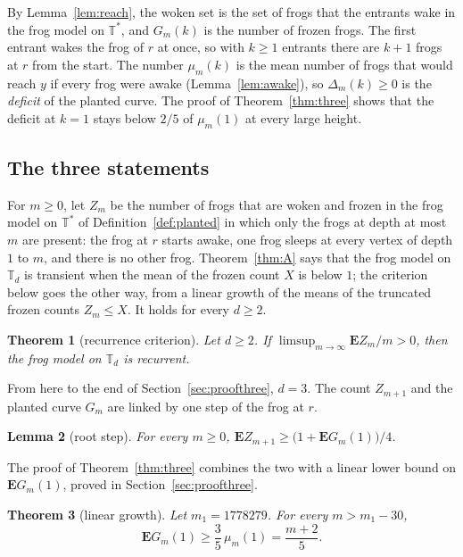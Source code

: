 \documentclass[11pt]{amsart}
\newtheorem{theorem}{Theorem}[section]
\newtheorem{lemma}[theorem]{Lemma}
\theoremstyle{definition}
\numberwithin{equation}{section}
\newcommand{\lean}[1]{\ignorespaces}
\newcommand{\T}{\mathbb{T}}
\newcommand{\Ts}{\mathbb{T}^{*}}
\newcommand{\E}{\mathbf{E}}
\begin{document}
By Lemma~\ref{lem:reach}, the woken set is the set of frogs that the entrants wake in the frog model on $\Ts$, and $G_m(k)$ is the number of frozen frogs. The first entrant wakes the frog of $r$ at once, so with $k\ge1$ entrants there are $k+1$ frogs at $r$ from the start. The number $\mu_m(k)$ is the mean number of frogs that would reach $y$ if every frog were awake (Lemma~\ref{lem:awake}), so $\Delta_m(k)\ge0$ is the \emph{deficit} of the planted curve. The proof of Theorem~\ref{thm:three} shows that the deficit at $k=1$ stays below $2/5$ of $\mu_m(1)$ at every large height.

\subsection*{The three statements}
For $m\ge0$, let $Z_m$ be the number of frogs that are woken and frozen in the frog model on $\Ts$ of Definition~\ref{def:planted} in which only the frogs at depth at most $m$ are present: the frog at $r$ starts awake, one frog sleeps at every vertex of depth $1$ to $m$, and there is no other frog. Theorem~\ref{thm:A} says that the frog model on $\T_d$ is transient when the mean of the frozen count $X$ is below $1$; the criterion below goes the other way, from a linear growth of the means of the truncated frozen counts $Z_m\le X$. It holds for every $d\ge2$.

\begin{theorem}[recurrence criterion]\label{thm:crit}\lean{FrogModel.LemmaR.recurrent_of_plantedCount, FrogModel.LemmaR.plantedCount, FrogModel.LemmaR.plantedLemmaR', FrogModel.ZeroOne.recurrent_of_frozenCount}
Let $d\ge2$. If $\limsup_{m\to\infty}\E Z_m/m>0$, then the frog model on $\T_d$ is recurrent.
\end{theorem}

From here to the end of Section~\ref{sec:proofthree}, $d=3$. The count $Z_{m+1}$ and the planted curve $G_m$ are linked by one step of the frog at $r$.

\begin{lemma}[root step]\label{lem:rootstep}\lean{FrogModel.D3.LaneA.lemma19_proof, FrogModel.D3.Iface.lemma19}
For every $m\ge0$, $\E Z_{m+1}\ge\bigl(1+\E G_m(1)\bigr)/4$.
\end{lemma}

The proof of Theorem~\ref{thm:three} combines the two with a linear lower bound on $\E G_m(1)$, proved in Section~\ref{sec:proofthree}.

\begin{theorem}[linear growth]\label{thm:linear}\lean{FrogModel.D3.Assembly.linear_three', FrogModel.D3.Assembly.linear_three}
Let $m_1=1778279$. For every $m>m_1-30$,
\[
\E G_m(1)\ge\frac35\,\mu_m(1)=\frac{m+2}5.
\]
\end{theorem}
\end{document}
